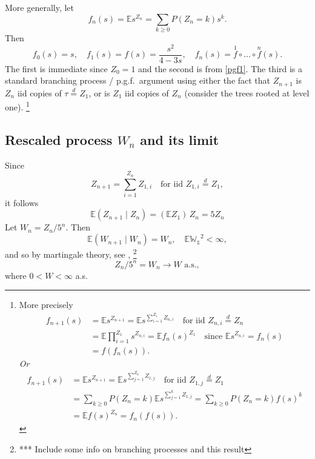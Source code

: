\documentclass[a4paper]{amsart}
\theoremstyle{plain}
\theoremstyle{definition}
\theoremstyle{remark}
\begin{document}
\medskip More generally, let 
\[ f_n(s) =   \mathbb{E} s^{Z_n} = \sum_{k\geq 0}  P(Z_n=k)s^k   .\]
Then
\begin{equation} \label{} 
f_0(s) = s, \quad f_1(s) = f(s) = \frac{s^2}{4-3s}, \quad f_n(s) = \overset{1}{f}\circ \dots \circ \overset{n}{f}(s).
\end{equation} 
The first is immediate since $ Z_0=1 $ and the second is from \eqref{pgf1}.  The third is a standard branching process / p.g.f.\  argument using either the fact that $ Z_{n+1} $ is $ Z_n $ iid copies of $ \tau \overset{d}{=} Z_1 $, or is $ Z_1 $ iid copies of $ Z_n $ (consider the trees rooted at level one).%
\footnote{More  precisely
\begin{align*}
f_{n+1}(s) &= \mathbb{E} s^{ Z_{n+1} } 
 = \mathbb{E} s^{ \sum_{i=1}^{ Z_1 }  Z_{n,i} } \quad \text{for iid }  Z_{n,i} 
                    \overset{d}{=} Z_n \\
  &=\mathbb{E}   \prod_{i=1}^{ Z_1 } s^{  Z_{n,i} }  
  = \mathbb{E} f_n(s)^{ Z_1 } \quad \text{since }\mathbb{E} s^{  Z_{n,i} }  = f_n(s) \\
  &= f ( f_n(s)).
\end{align*}
\emph{Or}
\begin{align*}
f_{n+1}(s) &= \mathbb{E} s^{ Z_{n+1} } = 
 \mathbb{E} s^{ \sum_{j=1}^{   Z_n }  Z_{1,j} } \quad \text{for iid }  Z_{1,j} 
                    \overset{d}{=} Z_1 \\
&= \sum_{k\geq 0} P(Z_n = k) \mathbb{E} s^{ \sum_{j=1}^{ k }  Z_{1,j} } 
=  \sum_{k\geq 0} P(Z_n = k)  f(s)^k\\
&= \mathbb{E} f(s)^{Z_n} = f_n(f(s)).
\end{align*} 
}



\subsection{Rescaled process $ W_n $ and its limit }
Since 
\[
Z_{n+1} =  \sum_{i=1}^{ Z_n }  Z_{1,i}   \quad \text{for iid }  Z_{1,i} 
                    \overset{d}{=} Z_1,  
\]
it follows 
\[
\mathbb{E}( Z_{n+1} \mid Z_n ) =( \mathbb{E} Z_1)\, Z_n = 
5 Z_n
\]
Let $ W_n = Z_n/5^n $.  Then 
\[  \mathbb{E} ( W_{n+1} \mid  W_n) =  W_n, \quad 
   \mathbb{E} \mathbb{W_1}^2 < \infty,
   \]
   and so by martingale theory, see \cite{Har},%
   \footnote{*** Include some info on branching processes and this result} 
\begin{equation} \label{}
Z_n/5^n =  W_n \to W \text{ a.s.},
\end{equation} 
where $ 0 < W < \infty $ a.s.  
\end{document}
